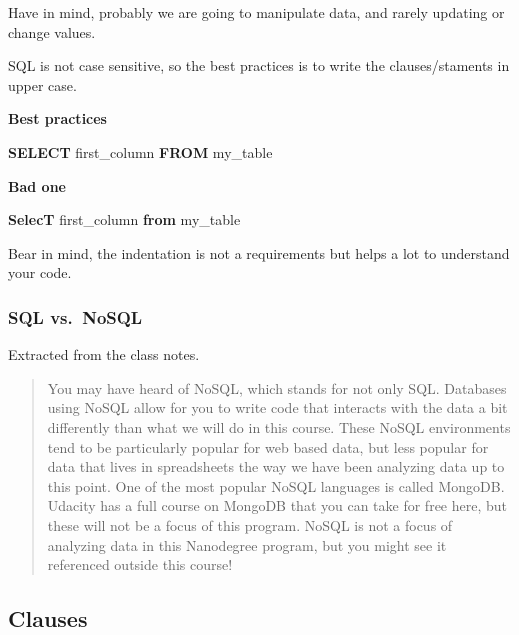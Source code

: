 \documentclass[]{book}
\newenvironment{Shaded}{\begin{snugshade}}{\end{snugshade}}
\newcommand{\KeywordTok}[1]{\textcolor[rgb]{0.13,0.29,0.53}{\textbf{#1}}}
\newcommand{\NormalTok}[1]{#1}
\begin{document}
Have in mind, probably we are going to manipulate data, and rarely
updating or change values.

SQL is not case sensitive, so the best practices is to write the
clauses/staments in upper case.

\textbf{Best practices}

\begin{Shaded}
\begin{Highlighting}[]
\KeywordTok{SELECT}\NormalTok{ first_column}
  \KeywordTok{FROM}\NormalTok{ my_table}
\end{Highlighting}
\end{Shaded}

\textbf{Bad one}

\begin{Shaded}
\begin{Highlighting}[]
\KeywordTok{SelecT}\NormalTok{ first_column}
\KeywordTok{from}\NormalTok{ my_table}
\end{Highlighting}
\end{Shaded}

Bear in mind, the indentation is not a requirements but helps a lot to
understand your code.

\subsubsection{SQL vs.~NoSQL}\label{sql-vs.nosql}

Extracted from the class notes.

\begin{quote}
You may have heard of NoSQL, which stands for not only SQL. Databases
using NoSQL allow for you to write code that interacts with the data a
bit differently than what we will do in this course. These NoSQL
environments tend to be particularly popular for web based data, but
less popular for data that lives in spreadsheets the way we have been
analyzing data up to this point. One of the most popular NoSQL languages
is called MongoDB. Udacity has a full course on MongoDB that you can
take for free here, but these will not be a focus of this program. NoSQL
is not a focus of analyzing data in this Nanodegree program, but you
might see it referenced outside this course!
\end{quote}

\subsection{Clauses}\label{clauses}
\end{document}
